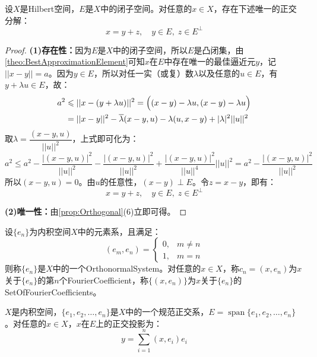 \begin{theorem}\label{theo:OrthogonalProjection}
	设$X$是Hilbert空间，$E$是$X$中的闭子空间。对任意的$x\in X$，存在下述唯一的正交分解：
	\begin{equation*}
		x=y+z,\quad y\in E,\;z\in E^{\perp}
	\end{equation*}
\end{theorem}
\begin{proof}
	\textbf{(1)存在性：}因为$E$是$X$中的闭子空间，所以$E$是凸闭集，由\cref{theo:BestApproximationElement}可知$x$在$E$中存在唯一的最佳逼近元$y$，记$||x-y||=a$。因为$y\in E$，所以对任一实（或复）数$\lambda$以及任意的$u\in E$，有$y+\lambda u\in E$，故：
	\begin{align*}
		a^2
		&\leqslant||x-(y+\lambda u)||^2 =\Bigl((x-y)-\lambda u,(x-y)-\lambda u\Bigr) \\
		&=||x-y||^2-\overline{\lambda}(x-y,u)-\lambda(u,x-y)+|\lambda|^2||u||^2
	\end{align*}
	取$\lambda=\dfrac{(x-y,u)}{||u||^2}$，上式即可化为：
	\begin{equation*}
		a^2\leqslant a^2-\frac{|(x-y,u)|^2}{||u||^2}-\frac{|(x-y,u)|^2}{||u||^2}+\frac{|(x-y,u)|^2}{||u||^4}||u||^2=a^2-\frac{|(x-y,u)|^2}{||u||^2}
	\end{equation*}
	所以$(x-y,u)=0$。由$u$的任意性，$(x-y)\perp E$。令$z=x-y$，即有：
	\begin{equation*}
		x=y+z,\quad y\in E,\;z\in E^{\perp}
	\end{equation*}\par
	\textbf{(2)唯一性：}由\cref{prop:Orthogonal}(6)立即可得。
\end{proof}
\begin{definition}
	设$\{e_n\}$为内积空间$X$中的元素系，且满足：
	\begin{equation*}
		(e_m,e_n)=
		\begin{cases}
			0,&m\ne n \\
			1,&m=n
		\end{cases}
	\end{equation*}
	则称$\{e_n\}$是$X$中的一个\gls{OrthonormalSystem}。对任意的$x\in X$，称$c_n=(x,e_n)$为$x$关于$\{e_n\}$的第$n$个\gls{FourierCoefficient}，称$\{(x,e_n)\}$为$x$关于$\{e_n\}$的\gls{SetOfFourierCoefficients}。
\end{definition}
\begin{lemma}\label{lem:OrthogonalProjectionSpan}
	$X$是内积空间，$\{e_1,e_2,\dots,e_n\}$是$X$中的一个规范正交系，$E=\operatorname{span}\{e_1,e_2,\dots,e_n\}$。对任意的$x\in X$，$x$在$E$上的正交投影为：
	\begin{equation*}
		y=\sum_{i=1}^{n}(x,e_i)e_i
	\end{equation*}
\end{lemma}
